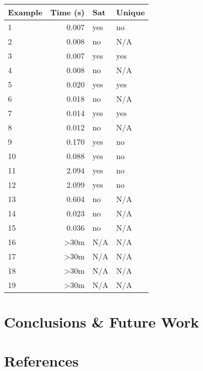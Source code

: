 \documentclass[11pt]{article}
\begin{document}
		\begin{table}[]
			\begin{tabular}{|l|l|l|l|}
			\hline
			\textbf{Example} & \textbf{Time (s)}          & \textbf{Sat} & \textbf{Unique} \\ \hline
			1                & \multicolumn{1}{r|}{0.007} & yes          & no              \\
			2				 & \multicolumn{1}{r|}{0.008} & no           & N/A             \\
			3				 & \multicolumn{1}{r|}{0.007} & yes          & yes             \\
			4				 & \multicolumn{1}{r|}{0.008} & no           & N/A             \\
			5				 & \multicolumn{1}{r|}{0.020} & yes          & yes             \\
			6				 & \multicolumn{1}{r|}{0.018} & no           & N/A             \\
			7				 & \multicolumn{1}{r|}{0.014} & yes          & yes             \\
			8				 & \multicolumn{1}{r|}{0.012} & no           & N/A             \\
			9				 & \multicolumn{1}{r|}{0.170} & yes          & no              \\
			10				 & \multicolumn{1}{r|}{0.088} & yes          & no              \\
			11				 & \multicolumn{1}{r|}{2.094} & yes          & no              \\
			12				 & \multicolumn{1}{r|}{2.099} & yes          & no              \\
			13				 & \multicolumn{1}{r|}{0.604} & no           & N/A             \\
			14				 & \multicolumn{1}{r|}{0.023} & no           & N/A             \\
			15				 & \multicolumn{1}{r|}{0.036} & no           & N/A             \\
			16				 & \multicolumn{1}{r|}{>30m}  & N/A          & N/A             \\
			17				 & \multicolumn{1}{r|}{>30m}  & N/A          & N/A             \\
			18				 & \multicolumn{1}{r|}{>30m}  & N/A          & N/A             \\
			19				 & \multicolumn{1}{r|}{>30m}  & N/A          & N/A             \\
			\end{tabular}
		\end{table}

	\section{Conclusions \& Future Work}



	\section{References}
	
	
\end{document}
